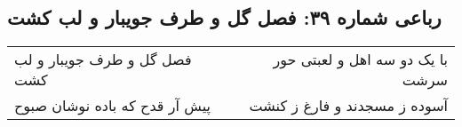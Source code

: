 \begin{center}
\section*{رباعی شماره ۳۹: فصل گل و طرف جویبار و لب کشت}
\label{sec:sh039}
\begin{longtable}{l p{0.5cm} r}
فصل گل و طرف جویبار و لب کشت
&&
با یک دو سه اهل و لعبتی حور سرشت
\\
پیش آر قدح که باده نوشان صبوح
&&
آسوده ز مسجدند و فارغ ز کنشت
\\
\end{longtable}
\end{center}
